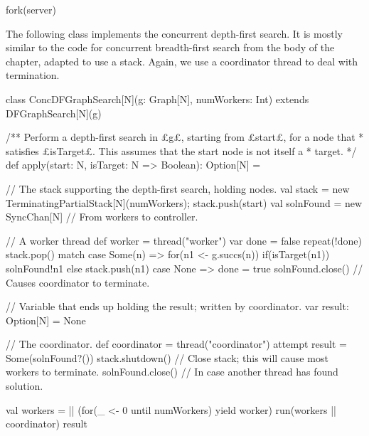 \begin{answerI}
\begin{scala}
{  fork(server)
}
\end{scala}


The following class implements the concurrent depth-first search.  It is
mostly similar to the code for concurrent breadth-first search from the body
of the chapter, adapted to use a stack.  Again, we use a coordinator thread to
deal with termination.
%
\begin{scala}
class ConcDFGraphSearch[N](g: Graph[N], numWorkers: Int)
     extends DFGraphSearch[N](g){
  /** Perform a depth-first search in £g£, starting from £start£, for a node that
    * satisfies £isTarget£.  This assumes that the start node is not itself a
    * target. */
  def apply(start: N, isTarget: N => Boolean): Option[N] = {
    // The stack supporting the depth-first search, holding nodes.
    val stack = new TerminatingPartialStack[N](numWorkers); stack.push(start)
    val solnFound = new SyncChan[N] // From workers to controller.

    // A worker thread
    def worker = thread("worker"){
      var done = false
      repeat(!done){
        stack.pop() match{
          case Some(n) => 
            for(n1 <- g.succs(n)){
              if(isTarget(n1)) solnFound!n1 else stack.push(n1)
            }
          case None => done = true
        }
      }
      solnFound.close() // Causes coordinator to terminate.
    }

    // Variable that ends up holding the result; written by coordinator. 
    var result: Option[N] = None

    // The coordinator.
    def coordinator = thread("coordinator"){
      attempt{ result = Some(solnFound?()) }{ }
      stack.shutdown() // Close stack; this will cause most workers to terminate.
      solnFound.close() // In case another thread has found solution.
    }

    val workers = || (for(_ <- 0 until numWorkers) yield worker)
    run(workers || coordinator)
    result
  }
}
\end{scala}
\end{answerI}
